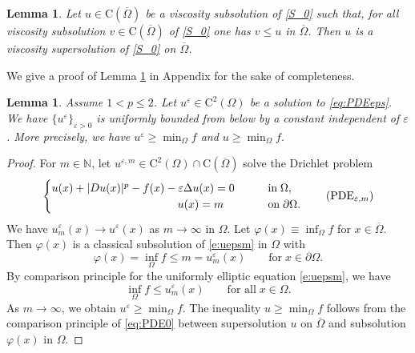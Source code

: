 \documentclass[11pt,reqno]{amsart}
\numberwithin{figure}{section}
\theoremstyle{plain}
\newtheorem{lem}[thm]{Lemma}
\theoremstyle{remark}
\numberwithin{equation}{section}
\newcommand{\rmC}{\mathrm{C}}
\begin{document}
\begin{lem}\label{lem:max} Let $u\in \rmC(\overline{\Omega})$ be a viscosity subsolution of \eqref{S_0} such that, for all viscosity subsolution $v\in \rmC(\overline{\Omega})$ of \eqref{S_0} one has $v\leq u$ in $\overline{\Omega}$. Then $u$ is a viscosity supersolution of \eqref{S_0} on $\overline{\Omega}$.
\end{lem}
\noindent We give a proof of Lemma \ref{lem:max} in Appendix for the sake of completeness. 

\begin{lem}\label{lem:lower-bound} Assume $1<p\leq 2$. Let $u^\varepsilon\in \mathrm{C}^2(\Omega)$ be a solution to \eqref{eq:PDEeps}. We have $\{  u^\varepsilon\}_{\varepsilon>0}$ is uniformly bounded from below by a constant independent of $\varepsilon$. More precisely, we have $  u^\varepsilon \geq \min_\Omega f$ and $  u\geq \min_\Omega f$.
\end{lem}
\begin{proof} For $m\in \mathbb{N}$, let $u^{\varepsilon,m}\in \mathrm{C}^2(\Omega)\cap \rmC(\overline{\Omega})$ solve the Drichlet problem
\begin{equation}\label{e:uepsm}
    \begin{cases}
      u(x) + |Du(x)|^p - f(x) - \varepsilon \Delta u(x) = 0 &\qquad
    \text{in}\;\Omega, \vspace{0cm}\\
    \;\qquad\quad\qquad\qquad\qquad\qquad u(x) = m &\qquad
    \text{on}\;\partial\Omega.
    \end{cases} \tag{PDE$_{\varepsilon,m}$}
\end{equation}
We have $u^{\varepsilon}_m(x) \to u^\varepsilon(x)$ as $m\to \infty$ in $\Omega$. Let $\varphi(x) \equiv  \inf_{\Omega} f$ for $x\in \overline{\Omega}$. Then $\varphi(x)$ is a classical subsolution of \eqref{e:uepsm} in $\Omega$ with
\begin{equation*}
    \varphi(x) =   \inf_\Omega f \leq m = u^\varepsilon_m(x) \qquad\text{for}\;x\in \partial\Omega.
\end{equation*}
By comparison principle for the uniformly elliptic equation \eqref{e:uepsm}, we have
\begin{equation*}
     \inf_\Omega f \leq u^{\varepsilon}_m(x) \qquad\text{for all}\;x\in \Omega.
\end{equation*}
As $m\to \infty$, we obtain $  u^\varepsilon \geq \min_\Omega f$. The inequality $  u\geq \min_{\Omega}f$ follows from the comparison principle of \eqref{eq:PDE0} between supersolution $u$ on $\overline{\Omega}$ and subsolution $\varphi(x)$ in $\Omega$.
\end{proof}
\end{document}
